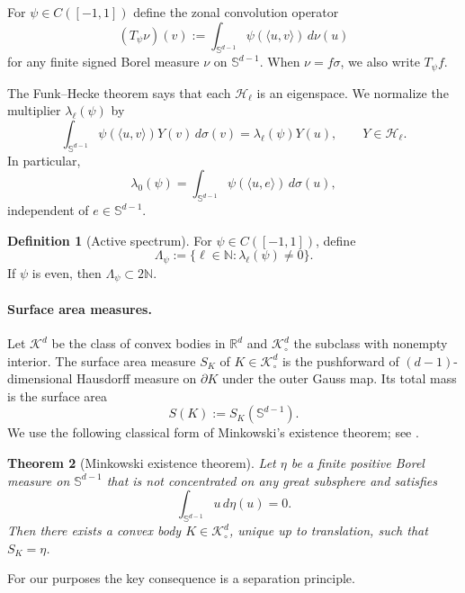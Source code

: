 \documentclass[12pt,a4paper]{article}
\newcommand{\Sph}{\mathbb S}
\newcommand{\R}{\mathbb R}
\newcommand{\N}{\mathbb N}
\newcommand{\K}{\mathcal K}
\newcommand{\Harm}{\mathcal H}
\theoremstyle{plain}
\newtheorem{theorem}{Theorem}[section]
\theoremstyle{definition}
\newtheorem{definition}[theorem]{Definition}
\begin{document}
For $\psi\in C([-1,1])$ define the zonal convolution operator
\begin{equation}\label{eq:Tpsi}
 (T_\psi\nu)(v)
 :=\int_{\Sph^{d-1}}\psi(\langle u,v\rangle)\,d\nu(u)
\end{equation}
for any finite signed Borel measure $\nu$ on $\Sph^{d-1}$.  When $\nu=f\sigma$, we also write $T_\psi f$.

The Funk--Hecke theorem says that each $\Harm_\ell$ is an eigenspace.  We normalize the multiplier $\lambda_\ell(\psi)$ by
\begin{equation}\label{eq:FH}
 \int_{\Sph^{d-1}}\psi(\langle u,v\rangle)Y(v)\,d\sigma(v)
 =\lambda_\ell(\psi)Y(u),
 \qquad Y\in\Harm_\ell.
\end{equation}
In particular,
\begin{equation}\label{eq:lambda0}
 \lambda_0(\psi)
 =\int_{\Sph^{d-1}}\psi(\langle u,e\rangle)\,d\sigma(u),
\end{equation}
independent of $e\in\Sph^{d-1}$.

\begin{definition}[Active spectrum]\label{def:active}
For $\psi\in C([-1,1])$, define
\[
 \Lambda_\psi
 :=\{\ell\in\N:\lambda_\ell(\psi)\ne0\}.
\]
If $\psi$ is even, then $\Lambda_\psi\subset2\N$.
\end{definition}

\paragraph{Surface area measures.}

Let $\K^d$ be the class of convex bodies in $\R^d$ and $\K^d_\circ$ the subclass with nonempty interior.  The surface area measure $S_K$ of $K\in\K^d_\circ$ is the pushforward of $(d-1)$-dimensional Hausdorff measure on $\partial K$ under the outer Gauss map.  Its total mass is the surface area
\[
 S(K):=S_K(\Sph^{d-1}).
\]
We use the following classical form of Minkowski's existence theorem; see \cite[Sec.~8.2]{Schneider}.

\begin{theorem}[Minkowski existence theorem]\label{thm:minkowski}
Let $\eta$ be a finite positive Borel measure on $\Sph^{d-1}$ that is not concentrated on any great subsphere and satisfies
\[
 \int_{\Sph^{d-1}}u\,d\eta(u)=0.
\]
Then there exists a convex body $K\in\K^d_\circ$, unique up to translation, such that $S_K=\eta$.
\end{theorem}

For our purposes the key consequence is a separation principle.
\end{document}
